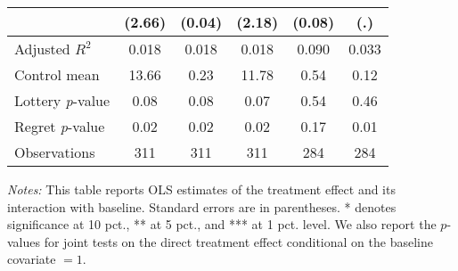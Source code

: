\begin{table}[h]
{\begin{threeparttable}
\begin{tabular}{l*{5}{c}}
                &   (2.66)         &   (0.04)         &   (2.18)         &   (0.08)         &      (.)         \\
\midrule
Adjusted \(R^{2}\)&    0.018         &    0.018         &    0.018         &    0.090         &    0.033         \\
Control mean    &    13.66         &     0.23         &    11.78         &     0.54         &     0.12         \\
Lottery \emph{p}-value&     0.08         &     0.08         &     0.07         &     0.54         &     0.46         \\
Regret \emph{p}-value&     0.02         &     0.02         &     0.02         &     0.17         &     0.01         \\
Observations    &      311         &      311         &      311         &      284         &      284         \\
\bottomrule \end{tabular} \begin{tablenotes}[flushleft] \footnotesize \item \emph{Notes:} This table reports OLS estimates of the treatment effect and its interaction with baseline. Standard errors are in parentheses. * denotes significance at 10 pct., ** at 5 pct., and *** at 1 pct. level. We also report the \(p\)-values for joint tests on the direct treatment effect conditional on the baseline covariate $= 1$. \end{tablenotes} \end{threeparttable} } \end{table}

